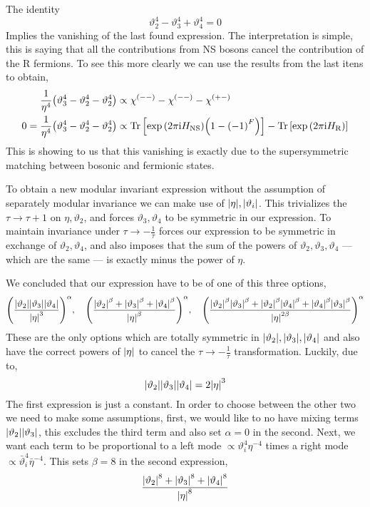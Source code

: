 The identity \[\vartheta^4_2-\vartheta^4_3+\vartheta^4_4=0\] Implies the vanishing of the last found expression. 
The interpretation is simple, this is saying that all the contributions from NS bosons cancel the 
contribution of the R fermions. To see this more clearly we can use the results from the last itens to 
obtain,
\begin{align*}
    \frac{1}{\eta^4}\qty(\vartheta^4_3-\vartheta^4_2-\vartheta_2^4)&\propto \chi^{(--)}-\chi^{(--)}-\chi^{(+-)}\\
    0=\frac{1}{\eta^4}\qty(\vartheta^4_3-\vartheta^4_2-\vartheta_2^4)&\propto\Tr\qty[\exp\qty(2\pi\textnormal{i} H_{\textnormal{NS}})\qty(1-\qty(-1)^F)]-\Tr\qty[\exp\qty(2\pi\textnormal{i} H_{\textnormal{R}})]
\end{align*}
This is showing to us that this vanishing is exactly due to the supersymmetric matching between bosonic and fermionic states.

To obtain a new modular invariant expression without the assumption of separately modular invariance 
we can make use of $\abs{\eta},\abs{\vartheta_ i}$. This trivializes the $\tau\rightarrow\tau+1$ 
on $\eta,\vartheta_2$, and forces $\vartheta_3,\vartheta_4$ to be symmetric in our expression. 
To maintain invariance under $\tau\rightarrow-\frac1\tau$ forces our expression to be 
symmetric in exchange of $\vartheta_2,\vartheta_4$, and also imposes that the sum of the powers 
of $\vartheta_2,\vartheta_3,\vartheta_4$ --- which are the same --- is exactly minus 
the power of $\eta$. 

We concluded that our expression have to be of one of this three options,
\[\qty(\frac{\abs{\vartheta_2}\abs{\vartheta_3}\abs{\vartheta_4}}{\abs{\eta}^3})^\alpha,\ \ \ \qty(\frac{\abs{\vartheta_2}^\beta+\abs{\vartheta_3}^\beta+\abs{\vartheta_4}^\beta}{\abs{\eta}^\beta})^\alpha,\ \ \ \qty(\frac{\abs{\vartheta_2}^\beta\abs{\vartheta_3}^\beta+\abs{\vartheta_2}^\beta\abs{\vartheta_4}^\beta+\abs{\vartheta_4}^\beta\abs{\vartheta_3}^\beta}{\abs{\eta}^{2\beta}})^\alpha\]
These are the only options which are totally symmetric in $\abs{\vartheta_2},\abs{\vartheta_3},\abs{\vartheta_4}$ and also 
have the correct powers of $\abs{\eta}$ to cancel the $\tau\rightarrow-\frac1\tau$ transformation. Luckily, due to,
\[\abs{\vartheta_2}\abs{\vartheta_3}\abs{\vartheta_4}=2\abs{\eta}^3\] The first expression is just a constant. In order to choose between 
the other two we need to make some assumptions, first, we would like to no have mixing terms $\abs{\vartheta_2}\abs{\vartheta_3}$, this 
excludes the third term and also set $\alpha=0$ in the second. Next, we want each term to be proportional to a 
left mode $\propto\vartheta_ i^4\eta^{-4}$ times a right mode $\propto{\bar\vartheta}_i^4{\bar\eta}^{-4}$. This 
sets $\beta=8$ in the second expression,
\[\frac{\abs{\vartheta_2}^8+\abs{\vartheta_3}^8+\abs{\vartheta_4}^8}{\abs{\eta}^8}\]